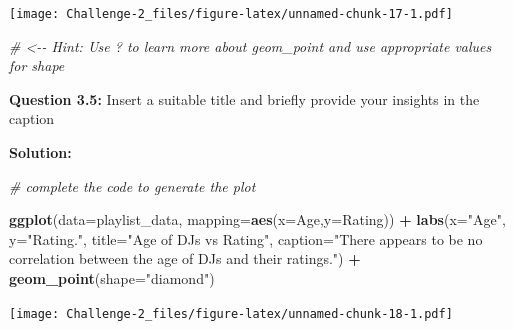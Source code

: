 \documentclass[
]{article}
\newenvironment{Shaded}{\begin{snugshade}}{\end{snugshade}}
\newcommand{\AttributeTok}[1]{\textcolor[rgb]{0.13,0.29,0.53}{#1}}
\newcommand{\CommentTok}[1]{\textcolor[rgb]{0.56,0.35,0.01}{\textit{#1}}}
\newcommand{\FunctionTok}[1]{\textcolor[rgb]{0.13,0.29,0.53}{\textbf{#1}}}
\newcommand{\NormalTok}[1]{#1}
\newcommand{\SpecialCharTok}[1]{\textcolor[rgb]{0.81,0.36,0.00}{\textbf{#1}}}
\newcommand{\StringTok}[1]{\textcolor[rgb]{0.31,0.60,0.02}{#1}}
\begin{document}
\texttt{[image: Challenge-2\_files/figure-latex/unnamed-chunk-17-1.pdf]}

\begin{Shaded}
\begin{Highlighting}[]
\CommentTok{\# \textless{}{-}{-} Hint: Use ? to learn more about geom\_point and use appropriate values for shape}
\end{Highlighting}
\end{Shaded}

\textbf{Question 3.5:} Insert a suitable title and briefly provide your
insights in the caption

\textbf{Solution:}

\begin{Shaded}
\begin{Highlighting}[]
\CommentTok{\# complete the code to generate the plot}

\FunctionTok{ggplot}\NormalTok{(}\AttributeTok{data=}\NormalTok{playlist\_data, }\AttributeTok{mapping=}\FunctionTok{aes}\NormalTok{(}\AttributeTok{x=}\NormalTok{Age,}\AttributeTok{y=}\NormalTok{Rating)) }\SpecialCharTok{+} \FunctionTok{labs}\NormalTok{(}\AttributeTok{x=}\StringTok{"Age"}\NormalTok{, }\AttributeTok{y=}\StringTok{"Rating."}\NormalTok{, }\AttributeTok{title=}\StringTok{"Age of DJs vs Rating"}\NormalTok{, }\AttributeTok{caption=}\StringTok{"There appears to be no correlation between the age of DJs and their ratings."}\NormalTok{) }\SpecialCharTok{+} \FunctionTok{geom\_point}\NormalTok{(}\AttributeTok{shape=}\StringTok{"diamond"}\NormalTok{)}
\end{Highlighting}
\end{Shaded}

\texttt{[image: Challenge-2\_files/figure-latex/unnamed-chunk-18-1.pdf]}
\end{document}

